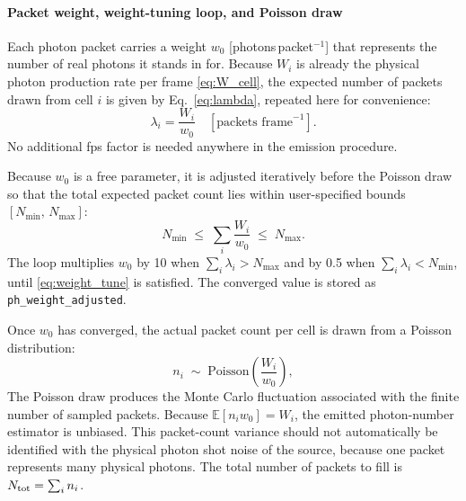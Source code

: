 \documentclass[12pt,a4paper]{article}
\newcommand{\code}[1]{\texttt{#1}}
\begin{document}
\paragraph{Packet weight, weight-tuning loop, and Poisson draw}
\label{sec:packet_count}

Each photon packet carries a weight $w_0$ [photons\,packet$^{-1}$] that
represents the number of real photons it stands in for.  Because $W_i$ is
already the physical photon production rate per frame \eqref{eq:W_cell},
the expected number of packets drawn from cell $i$ is given by
Eq.~\eqref{eq:lambda}, repeated here for convenience:
$$
\lambda_i = \frac{W_i}{w_0}
\quad [\text{packets frame}^{-1}].
$$
No additional fps factor is needed anywhere in the emission procedure.

Because $w_0$ is a free parameter, it is adjusted iteratively before the
Poisson draw so that the total expected packet count lies within
user-specified bounds $[N_{\min},\, N_{\max}]$:
\begin{equation}
	N_{\min} \;\le\; \sum_i \frac{W_i}{w_0} \;\le\; N_{\max}.
	\label{eq:weight_tune}
\end{equation}
The loop multiplies $w_0$ by 10 when $\sum_i\lambda_i > N_{\max}$ and by
0.5 when $\sum_i\lambda_i < N_{\min}$, until \eqref{eq:weight_tune} is
satisfied.  The converged value is stored as \code{ph\_weight\_adjusted}.

Once $w_0$ has converged, the actual packet count per cell is drawn from a
Poisson distribution:
\begin{equation}
	n_i \;\sim\; \mathrm{Poisson}\!\left(\frac{W_i}{w_0}\right),
	\label{eq:poisson}
\end{equation}
The Poisson draw produces the Monte Carlo fluctuation associated with the
finite number of sampled packets. Because
$\mathbb{E}[n_iw_0]=W_i$, the emitted photon-number estimator is unbiased.
This packet-count variance should not automatically be identified with
the physical photon shot noise of the source, because one packet represents
many physical photons.
The total number of packets to fill is $N_{\rm tot} = \sum_i n_i$.
\end{document}
